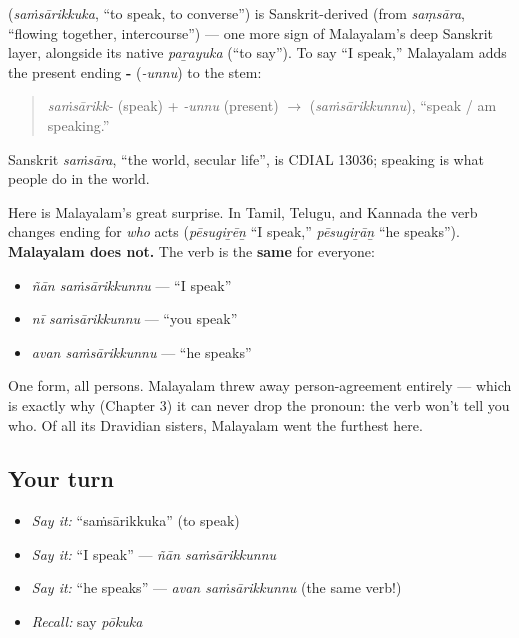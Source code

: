 \begin{cousinweb}
\textbf{} (\emph{saṁsārikkuka}, \textquotedblleft{}to speak, to converse\textquotedblright{}) is Sanskrit-derived (from \emph{saṃsāra}, \textquotedblleft{}flowing together, intercourse\textquotedblright{}) — one more sign of Malayalam's deep Sanskrit layer, alongside its native \emph{paṟayuka} (\textquotedblleft{}to say\textquotedblright{}). To say \textquotedblleft{}I speak,\textquotedblright{} Malayalam adds the present ending \textbf{-} (\emph{-unnu}) to the stem:

\begin{quote}
\emph{saṁsārikk-} (speak) + \emph{-unnu} (present) $\to$ \textbf{} (\emph{saṁsārikkunnu}), \textquotedblleft{}speak / am speaking.\textquotedblright{}
\end{quote}

Sanskrit \emph{saṁsāra}, \textquotedblleft{}the world, secular life\textquotedblright{}, is CDIAL 13036; speaking is what people do in the world.
\end{cousinweb}

\begin{grammarlens}[title={Grammar Lens: the verb never changes for person}]
Here is Malayalam's great surprise. In Tamil, Telugu, and Kannada the verb changes ending for \emph{who} acts (\emph{pēsugiṟēṉ} \textquotedblleft{}I speak,\textquotedblright{} \emph{pēsugiṟāṉ} \textquotedblleft{}he speaks\textquotedblright{}). \textbf{Malayalam does not.} The verb is the \textbf{same} for everyone:

\begin{itemize}
\raggedright
  \item \emph{ñān saṁsārikkunnu} — \textquotedblleft{}I speak\textquotedblright{}
  \item \emph{nī saṁsārikkunnu} — \textquotedblleft{}you speak\textquotedblright{}
  \item \emph{avan saṁsārikkunnu} — \textquotedblleft{}he speaks\textquotedblright{}
\end{itemize}

One form, all persons. Malayalam threw away person-agreement entirely — which is exactly why (Chapter 3) it can never drop the pronoun: the verb won't tell you who. Of all its Dravidian sisters, Malayalam went the furthest here.
\end{grammarlens}

\subsection*{Your turn}
\begin{itemize}
\raggedright
  \item \emph{Say it:} \textquotedblleft{}saṁsārikkuka\textquotedblright{} (to speak)
  \item \emph{Say it:} \textquotedblleft{}I speak\textquotedblright{} — \emph{ñān saṁsārikkunnu}
  \item \emph{Say it:} \textquotedblleft{}he speaks\textquotedblright{} — \emph{avan saṁsārikkunnu} (the same verb!)
  \item \emph{Recall:} say \emph{pōkuka}
\end{itemize}

